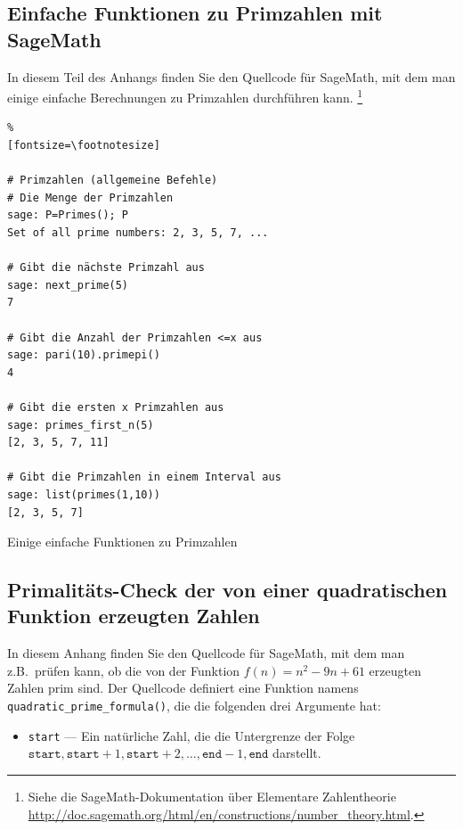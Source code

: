 \begin{refsegment}
\subsection{Einfache Funktionen zu Primzahlen mit SageMath}

In diesem Teil des Anhangs finden Sie den Quellcode für SageMath, mit dem man
einige einfache Berechnungen zu Primzahlen durchführen kann.%
\footnote{Siehe die SageMath-Dokumentation über Elementare Zahlentheorie
   \url{http://doc.sagemath.org/html/en/constructions/number_theory.html}.}

\begin{sagecode}
\begin{Verbatim}%
[fontsize=\footnotesize]

# Primzahlen (allgemeine Befehle)
# Die Menge der Primzahlen
sage: P=Primes(); P
Set of all prime numbers: 2, 3, 5, 7, ...

# Gibt die nächste Primzahl aus
sage: next_prime(5)
7

# Gibt die Anzahl der Primzahlen <=x aus
sage: pari(10).primepi()
4

# Gibt die ersten x Primzahlen aus
sage: primes_first_n(5)
[2, 3, 5, 7, 11]

# Gibt die Primzahlen in einem Interval aus
sage: list(primes(1,10))
[2, 3, 5, 7]

\end{Verbatim}
\caption{Einige einfache Funktionen zu Primzahlen}
\end{sagecode}



\newpage
\subsection{Primalitäts-Check der von einer quadratischen Funktion erzeugten Zahlen}

In diesem Anhang finden Sie den Quellcode für SageMath, mit dem man
z.B.\ prüfen kann, ob die von der Funktion $f(n) = n^2 - 9n + 61$
erzeugten Zahlen prim sind.
Der Quellcode definiert eine Funktion namens \verb!quadratic_prime_formula()!,
die die folgenden drei Argumente hat:
\begin{itemize}
\item \verb!start! --- Ein natürliche Zahl, die die Untergrenze der Folge
  $\texttt{start}, \texttt{start} + 1,
  \texttt{start} + 2, \dots, \texttt{end} - 1, \texttt{end}$ darstellt.


\end{itemize}
\end{refsegment}
